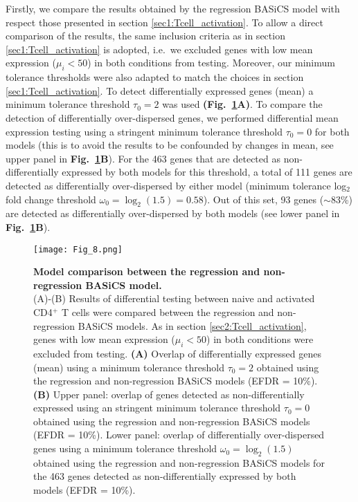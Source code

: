 Firstly, we compare the results obtained by the regression BASiCS model with respect those presented in section \ref{sec1:Tcell_activation}.  
To allow a direct comparison of the results, the same inclusion criteria as in section \ref{sec1:Tcell_activation} is adopted, i.e.~we excluded genes with low mean expression ($\mu_i<50$) in both conditions from testing. Moreover, our  minimum tolerance thresholds were also adapted to match the choices in section \ref{sec1:Tcell_activation}. To detect differentially expressed genes (mean) a minimum tolerance threshold $\tau_0 = 2$ was used \textbf{(Fig.~\ref{fig2:model_comparison}A)}. To compare the detection of differentially over-dispersed genes, we performed differential mean expression testing using a stringent minimum tolerance threshold $\tau_0 = 0$ for both models (this is to avoid the results to be confounded by changes in mean, see upper panel in \textbf{Fig.~\ref{fig2:model_comparison}B}). For the 463 genes that are detected as non-differentially expressed by both models for this threshold, a total of 111 genes are detected as differentially over-dispersed by either model (minimum tolerance log$_2$ fold change threshold $\omega_0 = \log_2(1.5) = 0.58$). Out of this set, 93 genes ($\sim$83\%) are detected as differentially over-dispersed by both models (see lower panel in \textbf{Fig.~\ref{fig2:model_comparison}B}). \\

\begin{figure}[!h]
\centering
\texttt{[image: Fig\_8.png]}
\caption[Model comparison between the regression and non-regression BASiCS model]{\textbf{Model comparison between the regression and non-regression BASiCS model.}\\
(A)-(B) Results of differential testing between naive and activated CD4$^+$ T cells were compared between the regression and non-regression BASiCS models. As in section \ref{sec2:Tcell_activation}, genes with low mean expression ($\mu_i<50$) in both conditions were excluded from testing. \textbf{(A)} Overlap of differentially expressed genes (mean) using a minimum tolerance threshold $
\tau_0=2$ obtained using the regression and non-regression BASiCS models (EFDR = 10\%).\textbf{(B)} Upper panel: overlap of genes detected as non-differentially expressed using an stringent minimum tolerance threshold $\tau_0=0$ obtained using the regression and non-regression BASiCS models (EFDR = 10\%). Lower panel: overlap of differentially over-dispersed genes using a minimum tolerance threshold $\omega_0=\log_2(1.5)$ obtained using the regression and non-regression  BASiCS models for the 463 genes detected as non-differentially expressed by both models (EFDR = 10\%).\\}
\label{fig2:model_comparison}
\end{figure}

